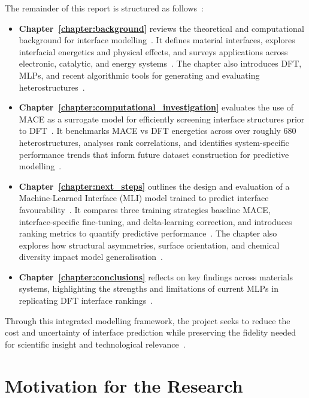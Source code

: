 \label{report_structure} The remainder of this report is structured as follows~\nocite{}:

\begin{itemize}
    \item \textbf{Chapter~\ref{chapter:background}} reviews the theoretical and computational background for interface modelling~\nocite{}.
    It defines material interfaces, explores interfacial energetics and physical effects, and surveys applications across electronic, catalytic, and energy systems~\nocite{}.
    The chapter also introduces DFT, MLPs, and recent algorithmic tools for generating and evaluating heterostructures~\nocite{}.
    \item \textbf{Chapter~\ref{chapter:computational_investigation}} evaluates the use of MACE as a surrogate model for efficiently screening interface structures prior to DFT~\nocite{}.
    It benchmarks MACE vs DFT energetics across over roughly 680 heterostructures, analyses rank correlations, and identifies system-specific performance trends that inform future dataset construction for predictive modelling~\nocite{}.
    \newpage \item \textbf{Chapter~\ref{chapter:next_steps}} outlines the design and evaluation of a Machine-Learned Interface (MLI) model trained to predict interface favourability~\nocite{}.
    It compares three training strategies baseline MACE, interface-specific fine-tuning, and delta-learning correction, and introduces ranking metrics to quantify predictive performance~\nocite{}.
    The chapter also explores how structural asymmetries, surface orientation, and chemical diversity impact model generalisation~\nocite{}.
    \item \textbf{Chapter~\ref{chapter:conclusions}} reflects on key findings across materials systems, highlighting the strengths and limitations of current MLPs in replicating DFT interface rankings~\nocite{}.
\end{itemize}

\label{framework_objective} Through this integrated modelling framework, the project seeks to reduce the cost and uncertainty of interface prediction while preserving the fidelity needed for scientific insight and technological relevance~\nocite{}.

\newpage \section{Motivation for the Research}\label{section:motivation}


